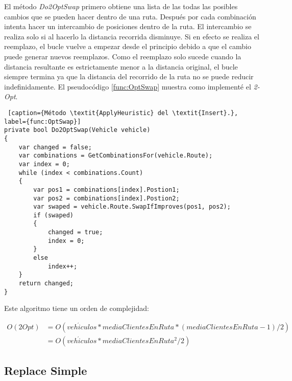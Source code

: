 \bigskip

El método \textit{Do2OptSwap} primero obtiene una lista de las todas las posibles cambios que se pueden hacer dentro de una ruta. Después por cada combinación intenta hacer un intercambio de posiciones dentro de la ruta. El intercambio se realiza solo si al hacerlo la distancia recorrida disminuye. Si en efecto se realiza el reemplazo, el bucle vuelve a empezar desde el principio debido a que el cambio puede generar nuevos reemplazos. Como el reemplazo solo sucede cuando la distancia resultante es estrictamente menor a la distancia original, el bucle siempre termina ya que la distancia del recorrido de la ruta no se puede reducir indefinidamente. El pseudocódigo \ref{func:OptSwap} muestra como implementé el \textit{2-Opt}.

\bigskip

\begin{minipage}{\textwidth}
\begin{lstlisting} [caption={Método \textit{ApplyHeuristic} del \textit{Insert}.}, label={func:OptSwap}]
private bool Do2OptSwap(Vehicle vehicle)
{
	var changed = false;	
	var combinations = GetCombinationsFor(vehicle.Route);
	var index = 0;
	while (index < combinations.Count)
	{
		var pos1 = combinations[index].Postion1;
		var pos2 = combinations[index].Postion2;
		var swaped = vehicle.Route.SwapIfImproves(pos1, pos2);
		if (swaped)
		{
			changed = true;
			index = 0;
		}
		else
			index++;
	}
	return changed;
}
\end{lstlisting}
\end{minipage}


\begin{minipage}{\linewidth}
Este algoritmo tiene un orden de complejidad:

\begin{equation*}
\begin{split}
O(2Opt) &= O(veh\acute{i}culos * mediaClientesEnRuta  * (mediaClientesEnRuta - 1) / 2) \\
            &= O(veh\acute{i}culos * mediaClientesEnRuta^2 / 2)
\end{split}
\end{equation*}
\end{minipage}

\bigskip

\subsection{Replace Simple}


